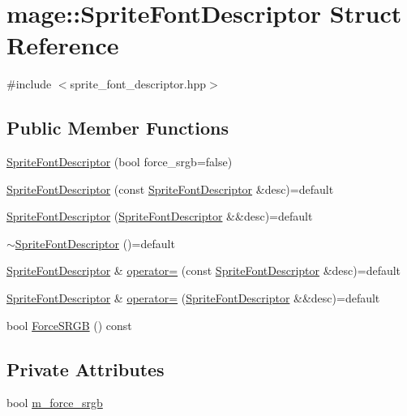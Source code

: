 \hypertarget{structmage_1_1_sprite_font_descriptor}{}\section{mage\+:\+:Sprite\+Font\+Descriptor Struct Reference}
\label{structmage_1_1_sprite_font_descriptor}


{\ttfamily \#include $<$sprite\+\_\+font\+\_\+descriptor.\+hpp$>$}

\subsection*{Public Member Functions}
\begin{DoxyCompactItemize}
\item 
\hyperlink{structmage_1_1_sprite_font_descriptor_a3622392aa130d14690c3cb1553b746bd}{Sprite\+Font\+Descriptor} (bool force\+\_\+srgb=false)
\item 
\hyperlink{structmage_1_1_sprite_font_descriptor_a8a8d4998026895fc55646a8d3538dcaa}{Sprite\+Font\+Descriptor} (const \hyperlink{structmage_1_1_sprite_font_descriptor}{Sprite\+Font\+Descriptor} \&desc)=default
\item 
\hyperlink{structmage_1_1_sprite_font_descriptor_a1b9b54d75205df352a65e6eb3665d675}{Sprite\+Font\+Descriptor} (\hyperlink{structmage_1_1_sprite_font_descriptor}{Sprite\+Font\+Descriptor} \&\&desc)=default
\item 
\hyperlink{structmage_1_1_sprite_font_descriptor_ab259871eed5ca9be3830d7da9cfc7092}{$\sim$\+Sprite\+Font\+Descriptor} ()=default
\item 
\hyperlink{structmage_1_1_sprite_font_descriptor}{Sprite\+Font\+Descriptor} \& \hyperlink{structmage_1_1_sprite_font_descriptor_a2279d65420bd8230a334c4ceb560fcf6}{operator=} (const \hyperlink{structmage_1_1_sprite_font_descriptor}{Sprite\+Font\+Descriptor} \&desc)=default
\item 
\hyperlink{structmage_1_1_sprite_font_descriptor}{Sprite\+Font\+Descriptor} \& \hyperlink{structmage_1_1_sprite_font_descriptor_a4d7c7df43f32819446f35ef71f49ebac}{operator=} (\hyperlink{structmage_1_1_sprite_font_descriptor}{Sprite\+Font\+Descriptor} \&\&desc)=default
\item 
bool \hyperlink{structmage_1_1_sprite_font_descriptor_a255defd4a4d706c37a755c0144c2a927}{Force\+S\+R\+GB} () const
\end{DoxyCompactItemize}
\subsection*{Private Attributes}
\begin{DoxyCompactItemize}
\item 
bool \hyperlink{structmage_1_1_sprite_font_descriptor_a7fa7230004e671127856e2ab1c27c94a}{m\+\_\+force\+\_\+srgb}
\end{DoxyCompactItemize}


